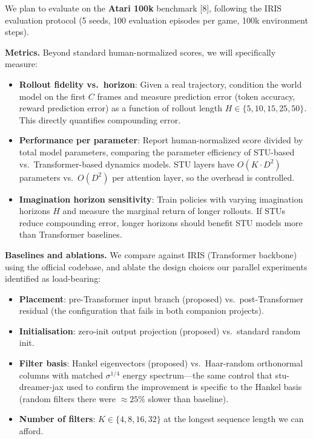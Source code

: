 \documentclass[10pt, letterpaper]{article}
\begin{document}
We plan to evaluate on the \textbf{Atari 100k} benchmark [8], following the IRIS evaluation protocol (5 seeds, 100 evaluation episodes per game, 100k environment steps).

\textbf{Metrics.} Beyond standard human-normalized scores, we will specifically measure:
\begin{itemize}[leftmargin=1.5em, nosep]
    \item \textbf{Rollout fidelity vs.\ horizon}: Given a real trajectory, condition the world model on the first $C$ frames and measure prediction error (token accuracy, reward prediction error) as a function of rollout length $H \in \{5, 10, 15, 25, 50\}$. This directly quantifies compounding error.
    \item \textbf{Performance per parameter}: Report human-normalized score divided by total model parameters, comparing the parameter efficiency of STU-based vs.\ Transformer-based dynamics models. STU layers have $O(K \cdot D^2)$ parameters vs.\ $O(D^2)$ per attention layer, so the overhead is controlled.
    \item \textbf{Imagination horizon sensitivity}: Train policies with varying imagination horizons $H$ and measure the marginal return of longer rollouts. If STUs reduce compounding error, longer horizons should benefit STU models more than Transformer baselines.
\end{itemize}

\textbf{Baselines and ablations.} We compare against IRIS (Transformer backbone) using the official codebase, and ablate the design choices our parallel experiments identified as load-bearing:
\begin{itemize}[leftmargin=1.5em, nosep]
    \item \textbf{Placement}: pre-Transformer input branch (proposed) vs.\ post-Transformer residual (the configuration that fails in both companion projects).
    \item \textbf{Initialisation}: zero-init output projection (proposed) vs.\ standard random init.
    \item \textbf{Filter basis}: Hankel eigenvectors (proposed) vs.\ Haar-random orthonormal columns with matched $\sigma^{1/4}$ energy spectrum---the same control that stu-dreamer-jax used to confirm the improvement is specific to the Hankel basis (random filters there were $\approx 25\%$ slower than baseline).
    \item \textbf{Number of filters}: $K \in \{4, 8, 16, 32\}$ at the longest sequence length we can afford.
\end{itemize}
\end{document}
